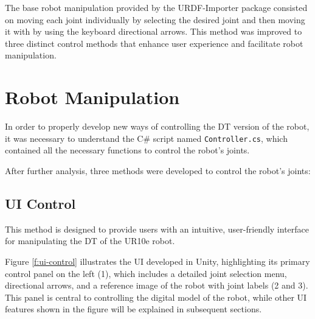 The base robot manipulation provided by the \ac{URDF}-Importer package consisted on moving each joint individually by selecting the desired joint and then moving it with by using the keyboard directional arrows. This method was improved to three distinct control methods that enhance user experience and facilitate robot manipulation.

\section{Robot Manipulation}
In order to properly develop new ways of controlling the \ac{DT} version of the robot, it was necessary to understand the C\# script named \texttt{Controller.cs}, which contained all the necessary functions to control the robot's joints.


After further analysis, three methods were developed to control the robot's joints:

    \subsection{UI Control}
    This method is designed to provide users with an intuitive, user-friendly interface for manipulating the \ac{DT} of the UR10e robot. 

    Figure \ref{f:ui-control} illustrates the \ac{UI} developed in Unity, highlighting its primary control panel on the left (1), which includes a detailed joint selection menu, directional arrows, and a reference image of the robot with joint labels (2 and 3). This panel is central to controlling the digital model of the robot, while other \ac{UI} features shown in the figure will be explained in subsequent sections.

